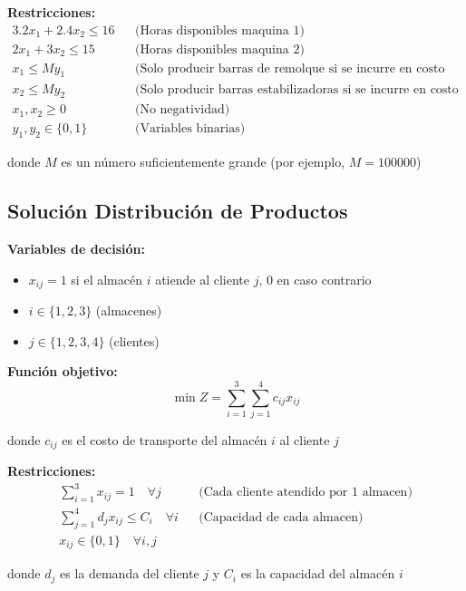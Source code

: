 \documentclass[12pt]{article}
\begin{document}
\textbf{Restricciones:}
\begin{align*}
    3.2x_1 + 2.4x_2 \leq 16 && \text{(Horas disponibles maquina 1)} \\
    2x_1 + 3x_2 \leq 15 && \text{(Horas disponibles maquina 2)} \\
    x_1 \leq My_1 && \text{(Solo producir barras de remolque si se incurre en costo fijo)} \\
    x_2 \leq My_2 && \text{(Solo producir barras estabilizadoras si se incurre en costo fijo)} \\
    x_1, x_2 \geq 0 && \text{(No negatividad)} \\
    y_1, y_2 \in \{0,1\} && \text{(Variables binarias)}
\end{align*}
\begin{center}
donde $M$ es un número suficientemente grande (por ejemplo, $M = 100000$)
\end{center}

\subsection{Solución Distribución de Productos}

\textbf{Variables de decisión:}
\begin{itemize}
    \item $x_{ij} = 1$ si el almacén $i$ atiende al cliente $j$, 0 en caso contrario
    \item $i \in \{1, 2, 3\}$ (almacenes)
    \item $j \in \{1, 2, 3, 4\}$ (clientes)
\end{itemize}

\textbf{Función objetivo:}
$$\min Z = \sum_{i=1}^{3} \sum_{j=1}^{4} c_{ij} x_{ij}$$
\begin{center}
donde $c_{ij}$ es el costo de transporte del almacén $i$ al cliente $j$
\end{center}

\textbf{Restricciones:}
\begin{align*}
    \sum_{i=1}^{3} x_{ij} = 1 \quad \forall j && \text{(Cada cliente atendido por 1 almacen)} \\
    \sum_{j=1}^{4} d_j x_{ij} \leq C_i \quad \forall i && \text{(Capacidad de cada almacen)} \\
    x_{ij} \in \{0,1\} \quad \forall i,j
\end{align*}
\begin{center}
donde $d_j$ es la demanda del cliente $j$ y $C_i$ es la capacidad del almacén $i$
\end{center}
\end{document}
